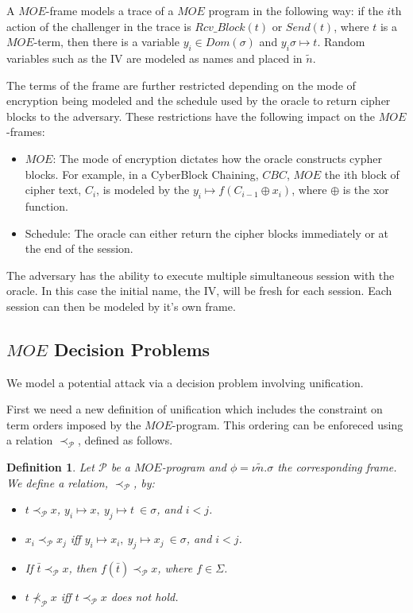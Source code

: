 \documentclass[11pt,twoside,a4paper]{article}
\newtheorem{definition}{Definition}
\begin{document}
A $MOE$-frame models a trace of a $MOE$ program in the following way:
if the $i$th action of the challenger in the trace is 
$Rcv\_Block(t)$ or $Send(t)$, where $t$ is a $MOE$-term, 
then there is a variable $y_i \in Dom(\sigma)$ and 
$y_i \sigma \mapsto t$. Random variables such as the IV are 
modeled as names and placed in $\tilde{n}$.

The terms of the frame are further restricted depending on the mode of encryption being modeled and the schedule used by the oracle to
return cipher blocks to the adversary. These restrictions have
the following impact on the $MOE$-frames:
\begin{itemize}
	\item $MOE$: The mode of encryption dictates how the oracle 
	constructs cypher blocks. For example, in a CyberBlock Chaining,
	$CBC$, $MOE$ the ith block of cipher text, $C_i$, is modeled by
	the $y_i \mapsto f(C_{i-1} \oplus x_i)$, where $\oplus$ is
	the xor function.
	\item Schedule: The oracle can either return the 
	cipher blocks immediately or at the end of the session.  
\end{itemize}

The adversary has the ability to execute multiple simultaneous session with the oracle. In this case the initial name, the IV, will be fresh for each session. Each session can then be modeled by it's own frame. 




\subsection{$MOE$ Decision Problems}

We model a potential attack via a decision problem involving unification. 

First we need a new definition of unification which includes the 
constraint on term orders imposed by the $MOE$-program. This 
ordering can be enforeced using a relation $\prec_{\mathcal{P}}$, defined 
as follows. 

\begin{definition}
	Let $\mathcal{P}$ be a $MOE$-program and $\phi = \nu \tilde{n}.\sigma$ the corresponding frame. We define a relation, 
	$\prec_{\mathcal{P}}$, by:
	\begin{itemize}
		\item $t \prec_{\mathcal{P}} x$,
		$y_i \mapsto x, ~y_j \mapsto t ~ \in \sigma$, and
		$ i < j$.
		\item $x_i \prec_{\mathcal{P}} x_j$ iff 
		 $y_i \mapsto x_i, ~y_j \mapsto x_j ~ \in \sigma$, and
		 $ i < j$.
		 \item If $\bar{t} \prec_{\mathcal{P}} x$, then 
		 $f(\bar{t}) \prec_{\mathcal{P}} x$, where $f \in \Sigma$.
		 \item $t \not \prec_{\mathcal{P}} x$ iff $t \prec_{\mathcal{P}} x$ does not hold.
	\end{itemize}
\end{definition}
\end{document}
